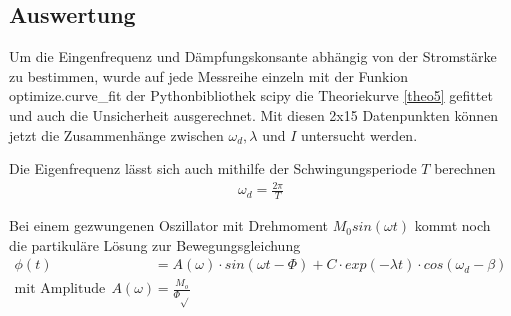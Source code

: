 \documentclass[11pt, a4paper]{article}
\begin{document}
    \subsection{Auswertung}
    Um die Eingenfrequenz und Dämpfungskonsante abhängig von der Stromstärke zu bestimmen,
    wurde auf jede Messreihe einzeln mit
    der Funkion \textsf{optimize.curve\_fit} der Pythonbibliothek scipy die Theoriekurve \ref{theo5}
    gefittet und auch die Unsicherheit ausgerechnet. Mit diesen 2x15 Datenpunkten können jetzt die Zusammenhänge
    zwischen $\omega_d, \lambda$ und $I$ untersucht werden.


    Die Eigenfrequenz lässt sich auch mithilfe der Schwingungsperiode $T$ berechnen
    \begin{align}
        \omega_d = \frac{2\pi}{T}
    \end{align}


    Bei einem gezwungenen Oszillator mit Drehmoment $M_0 sin(\omega t)$ kommt noch die partikuläre Lösung zur Bewegungsgleichung
    \begin{align}
        \phi(t) &= A(\omega) \cdot sin(\omega t - \Phi) + C \cdot exp(-\lambda t) \cdot cos(\omega_d - \beta) \\
        \text{mit Amplitude}  \ \ A(\omega) &= \frac{M_o}{\Phi \sqrt{}}
    \end{align}


    
    
\end{document}
